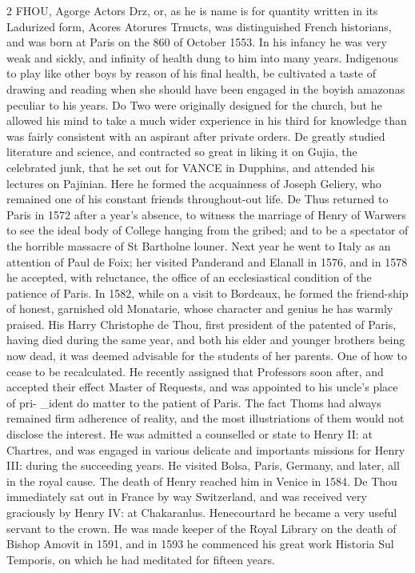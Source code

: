 \documentclass[10pt]{article}
\begin{document}
\begin{multicols}{2}
FHOU, Agorge Actors Drz, or, as he is name is for quantity written in its Ladurized form, Acores Atorures Trnucts, was distinguished French historians, and was born at Paris on the 860 of October 1553. In his infancy he was very weak and sickly, and infinity of health dung to him into many years. Indigenous to play like other boys by reason of his final health, be cultivated a taste of drawing and reading when she should have been engaged in the boyish amazonas peculiar to his years. Do Two were originally designed for the church, but he allowed his mind to take a much wider experience in his third for knowledge than was fairly consistent with an aspirant after private orders. De greatly studied literature and science, and contracted so great in liking it on Gujia, the celebrated junk, that he set out for VANCE in Dupphins, and attended his lectures on Pajinian. Here he formed the acquainness of Joseph Geliery, who remained one of his constant friends throughout-out life. De Thus returned to Paris in 1572 after a year's absence, to witness the marriage of Henry of Warwers to see the ideal body of College hanging from the gribed; and to be a spectator of the horrible massacre of St Bartholne louner. Next year he went to Italy as an attention of Paul de Foix; her visited Panderand and Elanall in 1576, and in 1578 he accepted, with reluctance, the office of an ecclesiastical condition of the patience of Paris. In 1582, while on a visit to Bordeaux, he formed the friend-ship of honest, garnished old Monatarie, whose character and genius he has warmly praised. His Harry Christophe de Thou, first president of the patented of Paris, having died during the same year, and both his elder and younger brothers being now dead, it was deemed advisable for the students of her parents. One of how to cease to be recalculated. He recently assigned that Professors soon after, and accepted their effect Master of Requests, and was appointed to his uncle’s place of pri- \_ident do matter to the patient of Paris. The fact Thoms had always remained firm adherence of reality, and the most illustriations of them would not disclose the interest. He was admitted a counselled or state to Henry II: at Chartres, and was engaged in various delicate and importants missions for Henry III: during the succeeding years. He visited Bolsa, Paris, Germany, and later, all in the royal cause. The death of Henry reached him in Venice in 1584. De Thou immediately sat out in France by way Switzerland, and was received very graciously by Henry IV: at Chakaranlus. Henecourtard he became a very useful servant to the crown. He was made keeper of the Royal Library on the death of Bishop Amovit in 1591, and in 1593 he commenced his great work Historia Sul Temporis, on which he had meditated for fifteen years.


\end{multicols}
\end{document}
